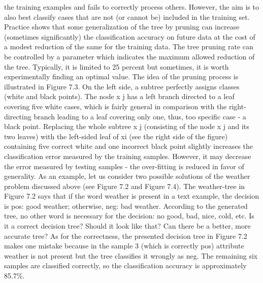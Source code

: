 \documentclass[11pt,openany,executivepaper]{book}
\begin{document}
the training examples and fails to correctly process others. However, the aim is
to also best classify cases that are not (or cannot be) included in the training set.
Practice shows that some generalization of the tree by pruning can increase
(sometimes significantly) the classification accuracy on future data at the cost
of a modest reduction of the same for the training data. The tree pruning rate
can be controlled by a parameter which indicates the maximum allowed reduction of the tree. Typically, it is limited to 25 percent but sometimes, it is worth
experimentally finding an optimal value.
The idea of the pruning process is illustrated in Figure 7.3. On the left side,
a subtree perfectly assigns classes (white and black points). The node x j has
a left branch directed to a leaf covering five white cases, which is fairly general
in comparison with the right-directing branch leading to a leaf covering only one,
thus, too specific case - a black point.
Replacing the whole subtree x j (consisting of the node x j and its two leaves)
with the left-sided leaf of xi (see the right side of the figure) containing five correct white and one incorrect black point slightly increases the classification error
measured by the training samples. However, it may decrease the error measured
by testing samples - the over-fitting is reduced in favor of generality.
As an example, let us consider two possible solutions of the weather problem
discussed above (see Figure 7.2 and Figure 7.4). The weather-tree in Figure 7.2
says that if the word weather is present in a text example, the decision is pos:
good weather; otherwise, neg: bad weather. According to the generated tree, no
other word is necessary for the decision: no good, bad, nice, cold, etc. Is it a correct decision tree? Should it look like that? Can there be a better, more accurate
tree? As for the correctness, the presented decision tree in Figure 7.2 makes one
mistake because in the sample 3 (which is correctly pos) attribute weather is not
present but the tree classifies it wrongly as neg. The remaining six samples are
classified correctly, so the classification accuracy is approximately 85.7\%.
\end{document}
